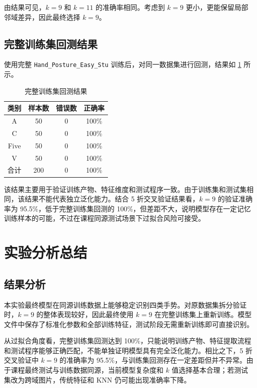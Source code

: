 \documentclass[11pt]{article}
\begin{document}
由结果可见，$k=9$ 和 $k=11$ 的准确率相同。考虑到 $k=9$ 更小，更能保留局部邻域差异，因此最终选择 $k=9$。

\subsection{完整训练集回测结果}

使用完整 \texttt{Hand\_Posture\_Easy\_Stu} 训练后，对同一数据集进行回测，结果如 \cref{tab:train-result} 所示。

\begin{table}[H]
\centering
\caption{完整训练集回测结果}
\label{tab:train-result}
\begin{tabular}{cccc}
\toprule
类别 & 样本数 & 错误数 & 正确率 \\
\midrule
A & 50 & 0 & 100\% \\
C & 50 & 0 & 100\% \\
Five & 50 & 0 & 100\% \\
V & 50 & 0 & 100\% \\
\midrule
合计 & 200 & 0 & 100\% \\
\bottomrule
\end{tabular}
\end{table}

该结果主要用于验证训练产物、特征维度和测试程序一致。由于训练集和测试集相同，该结果不能代表独立泛化能力。结合 5 折交叉验证结果看，$k=9$ 的验证准确率为 95.5\%，低于完整训练集回测的 100\%，但差距不大，说明模型存在一定记忆训练样本的可能，不过在课程同源测试场景下过拟合风险可接受。

\section{实验分析总结}

\subsection{结果分析}

本实验最终模型在同源训练数据上能够稳定识别四类手势。对原数据集拆分验证时，$k=9$ 的整体表现较好，因此最终使用 $k=9$ 在完整训练集上重新训练。模型文件中保存了标准化参数和全部训练特征，测试阶段无需重新训练即可直接识别。

从过拟合角度看，完整训练集回测达到 100\%，只能说明训练产物、特征提取流程和测试程序能够正确匹配，不能单独证明模型具有完全泛化能力。相比之下，5 折交叉验证中 $k=9$ 的准确率为 95.5\%，与训练集回测存在一定差距但并不异常。由于课程最终测试与训练数据同源，当前模型复杂度和 $k$ 值选择基本合理；若测试集改为跨域图片，传统特征和 KNN 仍可能出现准确率下降。
\end{document}
